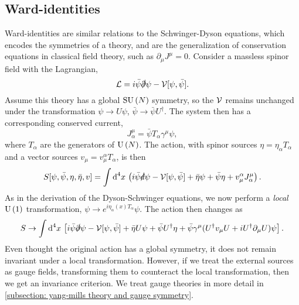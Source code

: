\subsection{Ward-identities}


Ward-identities are similar relations to the Schwinger-Dyson equations, which encodes the symmetries of a theory, and are the generalization of conservation equations in classical field theory, such as $\partial_\mu J^\mu = 0$.
Consider a massless spinor field with the Lagrangian,
%
\begin{equation}
    \mathcal{L} = i \bar \psi \slashed \partial \psi - \mathcal{V}[\psi, \bar \psi].
\end{equation}
%
Assume this theory has a global $\text{SU}\left(N\right)$ symmetry, so the $\mathcal{V}$ remains unchanged under the transformation $\psi \rightarrow U \psi$, $\bar \psi \rightarrow \bar \psi U^\dagger$.
The system then has a corresponding conserved current,
%
\begin{equation}
    J_\alpha^\mu = \bar \psi T_\alpha \gamma^\mu \psi,
\end{equation}
%
where $T_\alpha$ are the generators of $\text{U}\left(N\right)$.
The action, with spinor sources $\eta = \eta_\alpha T_\alpha$ and a vector sources $v_\mu = v_\mu^\alpha T_\alpha$, is then
%
\begin{equation}
    S[\psi, \bar \psi, \eta, \bar \eta, v]
    = 
    \int \text{d}^4 x \,
    \left(
        i \bar \psi \slashed d \psi - \mathcal{V}[\psi, \bar \psi]
        + \bar \eta \psi 
        + \bar \psi \eta + v_\mu^\alpha J^\mu_\alpha
    \right).
\end{equation}
%
As in the derivation of the Dyson-Schwinger equations, we now perform a \emph{local} $\text{U}\left(1\right)$ transformation, $\psi \rightarrow e^{i\eta_\alpha(x)T_\alpha} \psi$.
The action then changes as
%
\begin{equation}
    S \rightarrow 
    \int \text{d}^4 x \,
    \left[
        i \bar \psi \slashed \partial \psi 
        - \mathcal{V}[\psi, \bar \psi]
        + \bar \eta U \psi
        + \bar \psi U^\dagger \eta 
        + \bar \psi \gamma^\mu (U^\dagger v_\mu U + i U^\dagger \partial_\mu U)\psi
    \right].
\end{equation}
%
Even thought the original action has a global symmetry, it does not remain invariant under a local transformation.
However, if we treat the external sources as gauge fields, transforming them to counteract the local transformation, then we get an invariance criterion.
We treat gauge theories in more detail in \autoref{subsection: yang-mills theory and gauge symmetry}.
